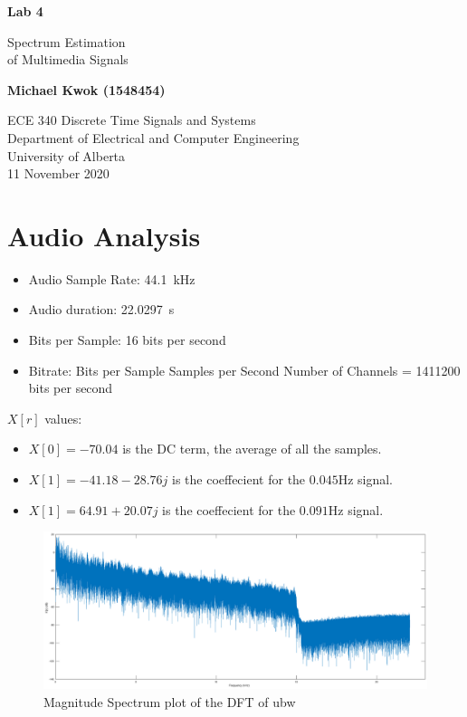 \documentclass{article}
\begin{document}
\begin{titlepage}
	\begin{center}
		\vspace*{1cm}

		\huge{\textbf{Lab 4}}

		\vspace{0.5cm}

		\LARGE{Spectrum Estimation\\of Multimedia Signals}
		\vspace{5cm}

		\Large{\textbf{Michael Kwok (1548454)}}

		\vfill
		ECE 340 Discrete Time Signals and Systems\\
		Department of Electrical and Computer Engineering\\
		University of Alberta\\
		11 November 2020
	\end{center}
\end{titlepage}
\section{Audio Analysis}
\begin{itemize}
	\item Audio Sample Rate: \SI{44.1}{\kilo\hertz}
	\item Audio duration: \SI{22.0297}{\second}
	\item Bits per Sample: 16 bits per second
	\item Bitrate: Bits per Sample \times{} Samples per Second \times{} Number of Channels = 1411200 bits per second
\end{itemize}


\(X[r]\) values:
\begin{itemize}
	\item \(X[0] = -70.04 \) is the DC term, the average of all the samples.
	\item \(X[1] = -41.18 - 28.76j \) is the coeffecient for the \( 0.045 \si{\hertz} \) signal.
	\item \(X[1] = 64.91 + 20.07j \) is the coeffecient for the \( 0.091 \si{\hertz} \) signal.
\end{itemize}

\begin{figure}
	\centering
	\includegraphics[width=\linewidth]{ubw}
	\caption{Magnitude Spectrum plot of the DFT of ubw}
	\label{fig:ubw}

\end{figure}
\end{document}
